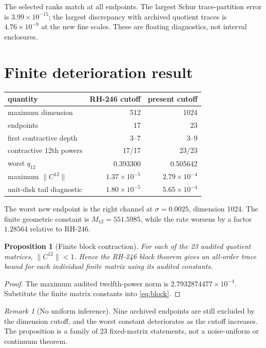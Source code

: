 \documentclass[11pt]{article}
\newtheorem{proposition}[theorem]{Proposition}
\theoremstyle{remark}
\newtheorem{remark}[theorem]{Remark}
\begin{document}
The selected ranks match at all endpoints.  The largest Schur trace-partition
error is $3.99\times10^{-15}$; the largest discrepancy with archived quotient
traces is $4.76\times10^{-9}$ at the new fine scales.  These are floating
diagnostics, not interval enclosures.

\section{Finite deterioration result}

\begin{center}
\small
\begin{tabular}{lrr}
\toprule
quantity & RH-246 cutoff & present cutoff\\
\midrule
maximum dimension & 512 & 1024\\
endpoints & 17 & 23\\
first contractive depth & 3--7 & 3--9\\
contractive 12th powers & 17/17 & 23/23\\
worst $q_{12}$ & 0.393300 & 0.505642\\
maximum $\|C^{12}\|$ & $1.37\times10^{-5}$ & $2.79\times10^{-4}$\\
unit-disk tail diagnostic & $1.80\times10^{-5}$ & $5.65\times10^{-4}$\\
\bottomrule
\end{tabular}
\end{center}

The worst new endpoint is the right channel at $\sigma=0.0025$, dimension
1024.  The finite geometric constant is $M_{12}=551.5985$, while the rate
worsens by a factor $1.28564$ relative to RH-246.

\begin{proposition}[Finite block contraction]
For each of the 23 audited quotient matrices, $\|C^{12}\|<1$.  Hence the
RH-246 block theorem gives an all-order trace bound for each individual finite
matrix using its audited constants.
\end{proposition}

\begin{proof}
The maximum audited twelfth-power norm is
$2.7932874477\times10^{-4}$.  Substitute the finite matrix constants into
\eqref{eq:block}.
\end{proof}

\begin{remark}[No uniform inference]
Nine archived endpoints are still excluded by the dimension cutoff, and the
worst constant deteriorates as the cutoff increases.  The proposition is a
family of 23 fixed-matrix statements, not a noise-uniform or continuum
theorem.
\end{remark}
\end{document}
